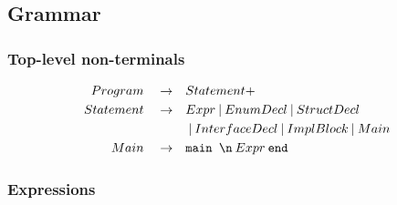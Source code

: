 \documentclass[a4paper, 12pt]{article}
\newcommand{\sepbar}{\: | \:}	%
\newcommand{\substo}{\quad\rightarrow\quad}
\renewcommand{\tt}{\texttt}
\begin{document}
\subsection{Grammar}
\subsubsection{Top-level non-terminals}
\begin{align*}
Program \substo& Statement+\\
Statement \substo& Expr \sepbar EnumDecl \sepbar StructDecl\\
&\sepbar InterfaceDecl \sepbar ImplBlock \sepbar Main\\
Main \substo& \tt{main \symbol{92}n}\: Expr \: \tt{end}
\end{align*}
\subsubsection{Expressions}
\end{document}
